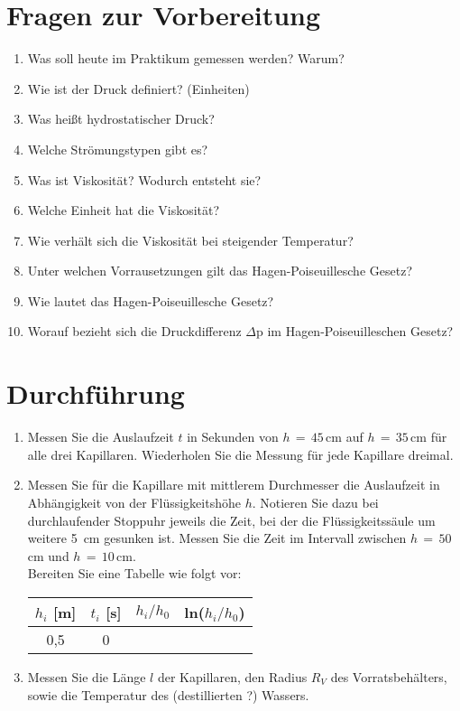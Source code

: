 \section{Fragen zur Vorbereitung}

\begin{enumerate}
 \item Was soll heute im Praktikum gemessen werden? Warum?
 \item Wie ist der Druck definiert? (Einheiten)
 \item Was heißt hydrostatischer Druck?
 \item Welche Strömungstypen gibt es?
 \item Was ist Viskosität? Wodurch entsteht sie?
 \item Welche Einheit hat die Viskosität?
 \item Wie verhält sich die Viskosität bei steigender Temperatur?
 \item Unter welchen Vorrausetzungen gilt das Hagen-Poiseuillesche Gesetz?
 \item Wie lautet das Hagen-Poiseuillesche Gesetz?
 \item Worauf bezieht sich die Druckdifferenz $\Delta$p im Hagen-Poiseuilleschen Gesetz?
\end{enumerate}

\section{Durchführung} 

\begin{enumerate}
 \item Messen Sie die Auslaufzeit $t$ in Sekunden von $h\,=\,45\,$cm auf $h\,=\,35\,$cm für alle drei Kapillaren. Wiederholen Sie die Messung für jede Kapillare dreimal.
 \item Messen Sie für die Kapillare mit mittlerem Durchmesser die Auslaufzeit in Abhängigkeit von der Flüssigkeitshöhe $h$. Notieren Sie dazu bei durchlaufender Stoppuhr jeweils die Zeit, bei der die Flüssigkeitssäule um weitere 5~cm gesunken ist. Messen Sie die Zeit im Intervall zwischen $h\,=\,50\,$cm und $h\,=\,10\,$cm.\\
 Bereiten Sie eine Tabelle wie folgt vor:
 \begin{table}[h]
	\centering
		\begin{tabular}{|c|c|c|c|}
			$h_i$ [m] & $t_i$ [s] & $h_i/h_0$ & ln($h_i/h_0$)\\ \hline \hline
			0,5 & 0 & & \\
		\end{tabular}
 \end{table}
 \item Messen Sie die Länge $l$ der Kapillaren, den Radius $R_V$ des Vorratsbehälters, sowie die Temperatur des (destillierten ?) Wassers.
\end{enumerate}

